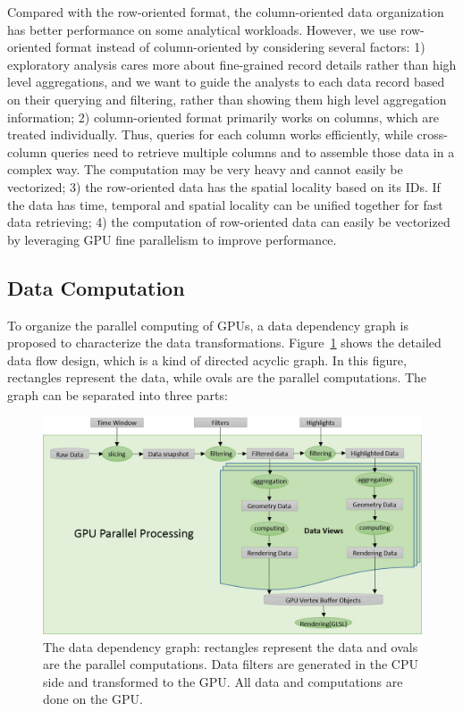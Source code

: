  Compared with the row-oriented format, the column-oriented data organization has better performance on some analytical workloads.  However, we use row-oriented format instead of column-oriented by considering several factors: 1) exploratory analysis cares more about fine-grained record details rather than high level aggregations, and we want to guide the analysts to each data record based on their querying and filtering, rather than showing them high level aggregation information; 2) column-oriented format primarily works on columns, which are treated individually. Thus, queries for each column works efficiently, while cross-column queries need to retrieve multiple columns and to assemble those data in a complex way. The computation may be very heavy and cannot easily be vectorized; 3) the row-oriented data has the spatial locality based on its IDs. If the data has time,  temporal and spatial locality can be unified together for fast data retrieving; 4) the computation of row-oriented data can easily be vectorized by leveraging GPU fine parallelism to improve performance.
 
 \subsection{Data Computation}       

To organize the parallel computing of GPUs, a data dependency graph is proposed to characterize the data transformations. Figure~\ref{fig:datagraph} shows the detailed data flow design, which is a kind of directed acyclic graph. In this figure,  rectangles represent the data, while ovals are the parallel computations. The graph can be separated into three parts:

\begin{figure}[htb]
	\centering
	\includegraphics[width=1.0\linewidth]{pic/flow-chart.png}
	\parbox[t]{1.0\columnwidth}{\relax
	}
	\caption{\label{fig:datagraph} The data dependency graph: rectangles represent the data and ovals are the parallel computations. Data filters are generated in the CPU side and transformed to the GPU. All data and computations are done on the GPU. } 
\end{figure} 

